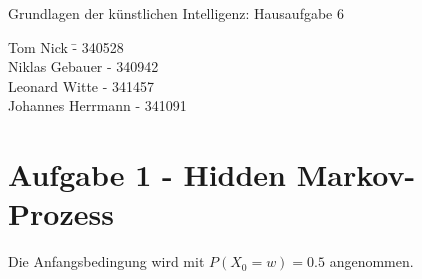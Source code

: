 \documentclass[a4paper,10pt]{article}
\begin{document}
\begin{center}
\Large{Grundlagen der künstlichen Intelligenz: Hausaufgabe 6} \\
\end{center}
\begin{tabbing}
Tom Nick \hspace{2cm}\= - 340528\\
Niklas Gebauer \> - 340942 \\
Leonard Witte \> - 341457 \\
Johannes Herrmann \> - 341091\\
\end{tabbing}

\section*{Aufgabe 1 - Hidden Markov-Prozess}
Die Anfangsbedingung wird mit $P(X_0 = w) = 0.5$ angenommen.
\end{document}
